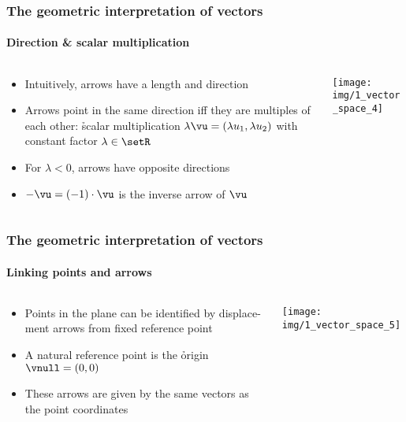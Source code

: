 \begin{frame}
  \frametitle{The geometric interpretation of vectors}
  \framesubtitle{Direction \& scalar multiplication}

  \begin{columns}[T]
    \begin{column}{48mm}
      \begin{itemize}
      \item Intuitively, arrows have a length and direction
      \item Arrows point in the same direction iff they are multiples of each
        other: \h{scalar multiplication} $\lambda \vu = (\lambda u_1,
        \lambda u_2)$ with constant factor $\lambda\in \setR$
      \item For $\lambda < 0$, arrows have opposite directions
      \item $-\vu = (-1)\cdot \vu$ is the inverse arrow of $\vu$
      \end{itemize}
    \end{column}
    \begin{column}{55mm}
      \texttt{[image: img/1\_vector\_space\_4]}
    \end{column}
  \end{columns}
\end{frame}

\begin{frame}
  \frametitle{The geometric interpretation of vectors}
  \framesubtitle{Linking points and arrows}

  \begin{columns}[T]
    \begin{column}{48mm}
      \begin{itemize}
      \item Points in the plane can be identified by displace-\\ment arrows from
        fixed reference point
      \item A natural reference point is the \h{origin} $\vnull = (0,0)$
      \item These arrows are given by the same vectors as the point coordinates
      \end{itemize}
    \end{column}
    \begin{column}{55mm}
      \texttt{[image: img/1\_vector\_space\_5]}
    \end{column}
  \end{columns}
\end{frame}


